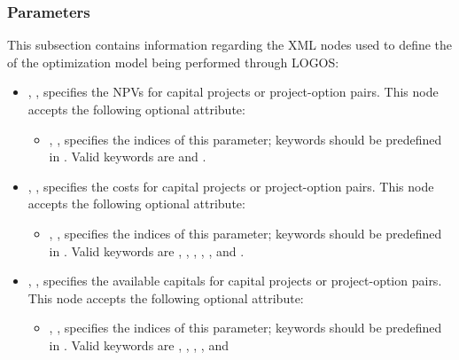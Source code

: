 \subsubsection{Parameters}
\label{subsubsec:Parameters}
This subsection contains information regarding the XML nodes used to define the
 of the optimization model being performed through LOGOS:
\begin{itemize}
  \item {}, ,
  specifies the NPVs for capital projects or project-option pairs. This node accepts the
  following optional attribute:
  \begin{itemize}
    \item {}, ,
    specifies the indices of this parameter; keywords should be predefined in .
    Valid keywords are  and .
  \end{itemize}
  \item {}, ,
  specifies the costs for capital projects or project-option pairs. This node accepts the
  following optional attribute:
  \begin{itemize}
    \item {}, ,
    specifies the indices of this parameter; keywords should be predefined in .
    Valid keywords are , ,
    , , ,
    and .
  \end{itemize}
  \item {}, ,
  specifies the available capitals for capital projects or project-option pairs.
  This node accepts the following optional attribute:
  \begin{itemize}
    \item {}, ,
    specifies the indices of this parameter; keywords should be predefined in .
    Valid keywords are , , ,
    , and 
  \end{itemize}
\end{itemize}

